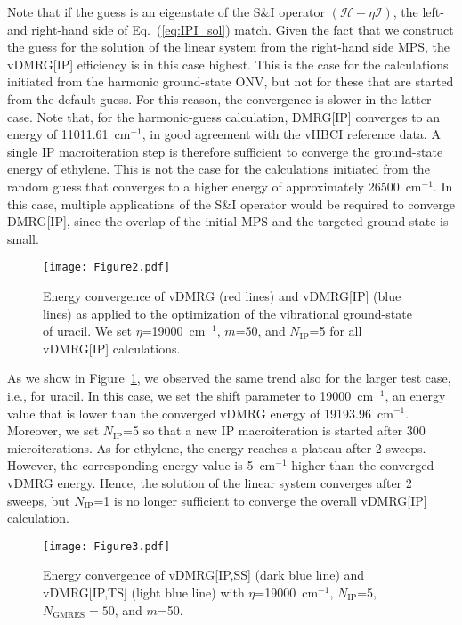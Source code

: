 \documentclass[journal=jctcce]{achemso}
\begin{document}
Note that if the guess is an eigenstate of the S\&I operator $(\mathcal{H} - \eta \mathcal{I})$, the left- and right-hand side of Eq.~(\ref{eq:IPI_sol}) match.
Given the fact that we construct the guess for the solution of the linear system from the right-hand side MPS, the vDMRG[IP] efficiency is in this case highest.
This is the case for the calculations initiated from the harmonic ground-state ONV, but not for these that are started from the default guess.
For this reason, the convergence is slower in the latter case.
Note that, for the harmonic-guess calculation, DMRG[IP] converges to an energy of 11011.61~cm$^{-1}$, in good agreement with the vHBCI reference data.\cite{Berkelbach2021_HBCI-Vibrational}
A single IP macroiteration step is therefore sufficient to converge the ground-state energy of ethylene.
This is not the case for the calculations initiated from the random guess that converges to a higher energy of approximately 26500~cm$^{-1}$.
In this case, multiple applications of the S\&I operator would be required to converge DMRG[IP], since the overlap of the initial MPS and the targeted ground state is small.

\begin{figure}[htbp!]
  \centering
  \texttt{[image: Figure2.pdf]}
  \caption{Energy convergence of vDMRG (red lines) and vDMRG[IP] (blue lines) as applied to the optimization of the vibrational ground-state of uracil.
  We set $\eta$=19000~cm$^{-1}$, $m$=50, and $N_\text{IP}$=5 for all vDMRG[IP] calculations.}
  \label{fig:UR_GS_IPIvsDMRG}
\end{figure}

\noindent As we show in Figure~\ref{fig:UR_GS_IPIvsDMRG}, we observed the same trend also for the larger test case, i.e., for uracil.
In this case, we set the shift parameter to 19000~cm$^{-1}$, an energy value that is lower than the converged vDMRG energy of 19193.96~cm$^{-1}$.
Moreover, we set $N_\text{IP}$=5 so that a new IP macroiteration is started after 300 microiterations.
As for ethylene, the energy reaches a plateau after 2 sweeps.
However, the corresponding energy value is 5~cm$^{-1}$ higher than the converged vDMRG energy.
Hence, the solution of the linear system converges after 2 sweeps, but $N_\text{IP}$=1 is no longer
sufficient to converge the overall vDMRG[IP] calculation.

\begin{figure}[htbp!]
  \centering
  \texttt{[image: Figure3.pdf]}
  \caption{Energy convergence of vDMRG[IP,SS] (dark blue line) and vDMRG[IP,TS] (light blue line) with $\eta$=19000~cm$^{-1}$, $N_\text{IP}$=5, $N_\text{GMRES}=50$, and $m$=50.}
  \label{fig:UR_IPI_Random}
\end{figure}
\end{document}
